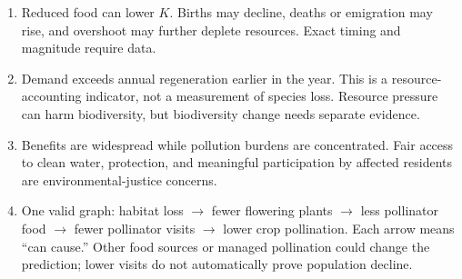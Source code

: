 \documentclass[11pt,letterpaper]{article}
\begin{document}
\begin{enumerate}[start=10,itemsep=5pt]
\item Reduced food can lower $K$. Births may decline, deaths or emigration may rise, and overshoot may further deplete resources. Exact timing and magnitude require data.
\item Demand exceeds annual regeneration earlier in the year. This is a resource-accounting indicator, not a measurement of species loss. Resource pressure can harm biodiversity, but biodiversity change needs separate evidence.
\item Benefits are widespread while pollution burdens are concentrated. Fair access to clean water, protection, and meaningful participation by affected residents are environmental-justice concerns.
\item One valid graph: habitat loss $\to$ fewer flowering plants $\to$ less pollinator food $\to$ fewer pollinator visits $\to$ lower crop pollination. Each arrow means ``can cause.'' Other food sources or managed pollination could change the prediction; lower visits do not automatically prove population decline.
\end{enumerate}
\end{document}
